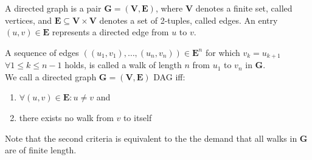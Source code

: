 A directed graph is a pair $\mathbf{G}=(\mathbf{V},\mathbf{E})$, where $\mathbf{V}$ denotes a finite set, called vertices, and $\mathbf{E}\subseteq \mathbf{V} \times \mathbf{V}$ denotes a set of 2-tuples, called edges.
An entry $(u,v)\in \mathbf{E}$ represents a directed edge from $u$ to $v$.


A sequence of edges $((u_1,v_1),\dots,(u_n,v_n))\in \mathbf{E}^n$ for which $v_k=u_{k+1}$ $\forall 1\leq k \leq n-1$ holds, is called a walk of length $n$ from $u_1$ to $v_n$ in $\mathbf{G}$.\\

We call a directed graph $\mathbf{G}=(\mathbf{V},\mathbf{E})$ \acf{DAG} iff:
\begin{enumerate}
  \item $\forall (u,v)\in\mathbf{E} : u \neq v $ and
  \item there exists no walk from $v$ to itself
\end{enumerate}

Note that the second criteria is equivalent to the the demand that all walks in $\mathbf{G}$ are of finite length.



